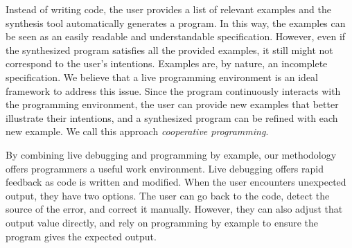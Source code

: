 Instead of writing code, the user provides a list of relevant examples and the synthesis tool automatically generates a program. In this way, the examples can be seen as an easily readable and understandable specification. However, even if the synthesized program satisfies all the provided examples, it still might not correspond to the user's intentions. Examples are, by nature, an incomplete specification. We believe that a live programming environment is an ideal framework to address this issue. Since the program continuously interacts with the programming environment, the user can provide new examples that better illustrate their intentions, and a synthesized program can be refined with each new example. We call this approach {\emph{cooperative programming}}.

By combining live debugging and programming by example,
our methodology offers programmers a useful work environment.
Live debugging offers rapid feedback as code is written and modified. 
When the user encounters unexpected output, they have two options.
The user can go back to the code, detect
the source of the error, and correct it manually.
However, they can also adjust that output value directly,
and rely on programming by example to ensure the program gives the expected output.





